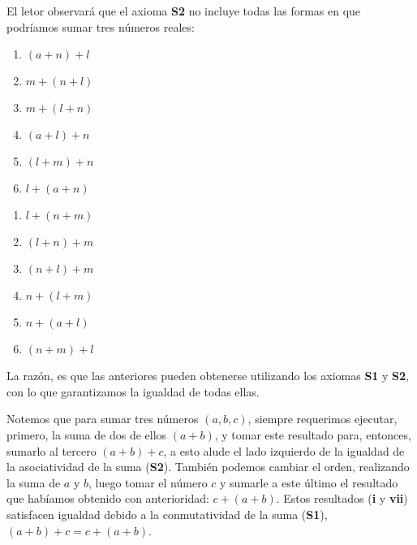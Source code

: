 \documentclass[11pt]{article}
\begin{document}
El letor observará que el axioma \textbf{S2} no incluye todas las formas en que podríamos sumar tres números reales:

\begin{adjustbox}{minipage=0.5\linewidth,margin=0pt \smallskipamount,center}
    \noindent\begin{minipage}[c]{.5\linewidth}
    \begin{enumerate}[label=\roman*.]
        \item $(a+n)+l$
        \item $m+(n+l)$
        \item $m+(l+n)$
        \item $(a+l)+n$
        \item $(l+m)+n$
        \item $l+(a+n)$
    \end{enumerate}
    \end{minipage}%
\begin{minipage}[c]{.5\linewidth}
    \begin{enumerate}[start=7,label=\roman*.]
        \item $l+(n+m)$
        \item $(l+n)+m$
        \item $(n+l)+m$
        \item $n+(l+m)$
        \item $n+(a+l)$
        \item $(n+m)+l$
    \end{enumerate}
\end{minipage}
\end{adjustbox}

La razón, es que las anteriores pueden obtenerse utilizando los axiomas \textbf{S1} y \textbf{S2}, con lo que garantizamos la igualdad de todas ellas.

Notemos que para sumar tres números $(a,b,c)$, siempre requerimos ejecutar, primero, la suma de dos de ellos $(a+b)$, y tomar este resultado para, entonces, sumarlo al tercero $(a+b)+c$, a esto alude el lado izquierdo de la igualdad de la asociatividad de la suma (\textbf{S2}). También podemos cambiar el orden, realizando la suma de $a$ y $b$, luego tomar el número $c$ y sumarle a este último el resultado que habíamos obtenido con anterioridad: $c+(a+b)$. Estos resultados (\textbf{i} y \textbf{vii}) satisfacen igualdad debido a la conmutatividad de la suma (\textbf{S1}), $(a+b)+c=c+(a+b)$.
\end{document}
